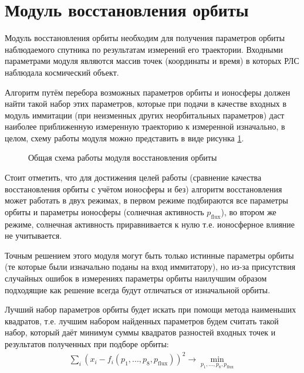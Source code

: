 \section{Модуль восстановления орбиты}

Модуль восстановления орбиты необходим для получения параметров орбиты наблюдаемого спутника по результатам
измерений его траектории. Входными параметрами модуля являются массив точек (координаты и время) в которых РЛС
наблюдала космический объект.

Алгоритм путём перебора возможных параметров орбиты и ионосферы должен найти такой набор этих параметров, которые
при подачи в качестве входных в модуль иммитации (при неизменных других неорбитальных параметров) даст наиболее
приближенную измеренную траекторию к измеренной изначально, в целом, схему работы модуля можно представить в виде рисунка \ref{common-resolver-scheme}.

\begin{figure}[h] 
	\centering
	
	\caption{Общая схема работы модуля восстановления орбиты} \label{common-resolver-scheme}
\end{figure}

Стоит отметить, что для достижения целей работы (сравнение качества восстановления орбиты с учётом ионосферы и без)
алгоритм восстановления может работать в двух режимах, в первом режиме подбираются все параметры орбиты и параметры
ионосферы (солнечная активность $p_{\text{flux}}$), во втором же режиме, солнечная активность приравнивается к нулю
т.е. ионосферное влияние не учитывается.

Точным решением этого модуля могут быть только истинные параметры орбиты (те которые были изначально поданы на
вход иммитатору), но из-за присутствия случайных ошибок в измерениях параметры орбиты наилучшим образом подходящие 
как решение всегда будут отличаться от изначальной орбиты.

Лучший набор параметров орбиты будет искать при помощи метода наименьших квадратов, т.е. лучшим набором найденных
параметров будем считать такой набор, который даёт минимум суммы квадратов разностей входных точек и результатов
полученных при подборе орбиты:
\begin{equation} \label{eq:mnk}
	\begin{aligned}
		\sum_i (x_i - f_i(p_1,...,p_8, p_{\text{flux}}))^2 \rightarrow \min_{p_1,...,p_8, p_{\text{flux}}}
	\end{aligned}
\end{equation}

